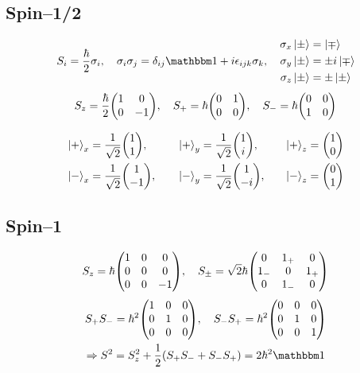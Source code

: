\subsection{Spin--1/2}
\begin{align*}
	S_{i} = \frac{\hbar}{2} \sigma_{i} \qc \sigma_{i} \sigma_{j} = \delta_{ij} \bbid + i \epsilon_{ijk} \sigma_{k} \qc
	\begin{aligned}
	\sigma_{x} \ket{\pm} &= \ket{\mp} \\
	\sigma_{y} \ket{\pm} &= \pm i \ket{\mp} \\
	\sigma_{z} \ket{\pm} &= \pm \ket{\pm}
\end{aligned}
\end{align*}
\begin{align*}
	S_{z} = \frac{\hbar}{2} \mqty(\dmat[0]{1,-1}) \qc S_{+} = \hbar \mqty(\admat[0]{1,0}) \qc S_{-} = \hbar \mqty(\admat[0]{0,1})
\end{align*}

\begin{alignat*}{3}
	\ket{+}_{x} &= \frac{1}{\sqrt{2}} \mqty(1 \\ 1) \qc && \ket{+}_{y} = \frac{1}{\sqrt{2}} \mqty(1 \\ i) \qc & \ket{+}_{z} = \mqty(1 \\ 0) \\
	\ket{-}_{x} &= \frac{1}{\sqrt{2}} \mqty(1 \\ -1) \qc && \ket{-}_{y} = \frac{1}{\sqrt{2}} \mqty(1 \\ -i) \qc & \ket{-}_{z} = \mqty(0 \\ 1) \\
\end{alignat*}

\subsection{Spin--1}
\begin{align*}
	S_{z} = \hbar \mqty(\dmat[0]{1,0,-1}) \qc S_{\pm} = \sqrt{2}\hbar \mqty( 0 & 1_{+} & 0 \\ 1_{-} & 0 & 1_{+} \\ 0 & 1_{-} & 0 )
\end{align*}
\begin{align*}
\begin{gathered}
	S_{+}S_{-} = \hbar^{2} \mqty(\dmat[0]{1,1,0}) \qc S_{-}S_{+} = \hbar^{2} \mqty(\dmat[0]{0,1,1}) \\
	\Rightarrow S^{2} = S_{z}^{2} + \frac{1}{2} \qty(S_{+}S_{-} + S_{-}S_{+}) = 2\hbar^{2} \bbid
\end{gathered}
\end{align*}

